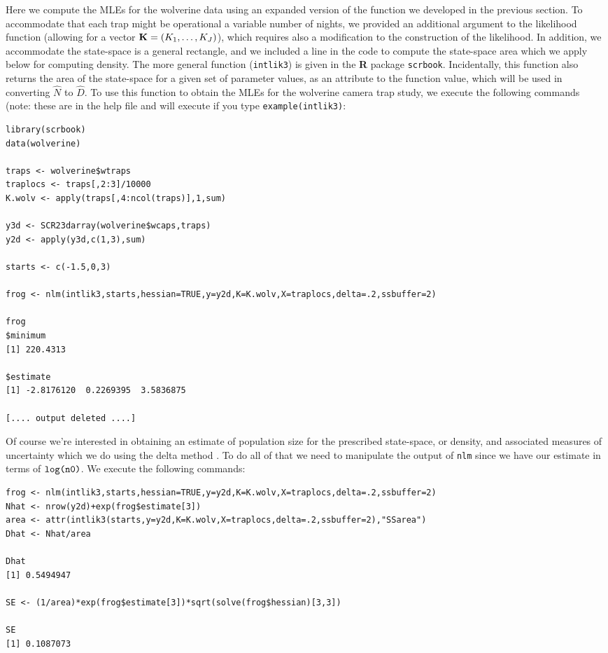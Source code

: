 Here we compute the MLEs for the wolverine data using an expanded
version of the function we developed in the previous section. To
accommodate that each trap might be operational a variable number of
nights, we provided an additional argument to the likelihood function
(allowing for a vector ${\bf K}= (K_{1},\ldots,K_{J})$), which requires also a modification to the
construction of the likelihood.  In addition,
we accommodate  the state-space is a general rectangle, and
we included a line in the code to compute the state-space area which
we apply below for computing density.  The more general function
(\mbox{\tt intlik3}) is given in the {\bf R} package \mbox{\tt scrbook}. 
Incidentally, this function also returns the area of the state-space for a given set
of parameter values, as an attribute to the function value, which will
be used in converting $\hat{N}$ to $\hat{D}$.
To use this function to obtain the MLEs for the wolverine camera trap
study, we execute the following commands (note: these are in the help
file and will execute if you type \mbox{\tt example(intlik3)}:
{\small
\begin{verbatim}
library(scrbook)
data(wolverine)
 
traps <- wolverine$wtraps
traplocs <- traps[,2:3]/10000
K.wolv <- apply(traps[,4:ncol(traps)],1,sum)

y3d <- SCR23darray(wolverine$wcaps,traps)
y2d <- apply(y3d,c(1,3),sum)

starts <- c(-1.5,0,3)

frog <- nlm(intlik3,starts,hessian=TRUE,y=y2d,K=K.wolv,X=traplocs,delta=.2,ssbuffer=2)

frog
$minimum
[1] 220.4313

$estimate
[1] -2.8176120  0.2269395  3.5836875

[.... output deleted ....]
\end{verbatim}
}
Of course we're interested in obtaining an estimate of population size
for the prescribed state-space, or density, and associated measures of
uncertainty which we do using the delta method
\citep[][Appendix F4]{williams_etal:2002}.
To do all of that we need to manipulate the output of
\mbox{\tt nlm} since we have our  estimate in terms of $\mbox{\tt
  log(n0)}$. We execute the following commands:
{\small 
\begin{verbatim}
frog <- nlm(intlik3,starts,hessian=TRUE,y=y2d,K=K.wolv,X=traplocs,delta=.2,ssbuffer=2)
Nhat <- nrow(y2d)+exp(frog$estimate[3])
area <- attr(intlik3(starts,y=y2d,K=K.wolv,X=traplocs,delta=.2,ssbuffer=2),"SSarea")
Dhat <- Nhat/area

Dhat
[1] 0.5494947

SE <- (1/area)*exp(frog$estimate[3])*sqrt(solve(frog$hessian)[3,3])

SE
[1] 0.1087073
\end{verbatim}
} 
